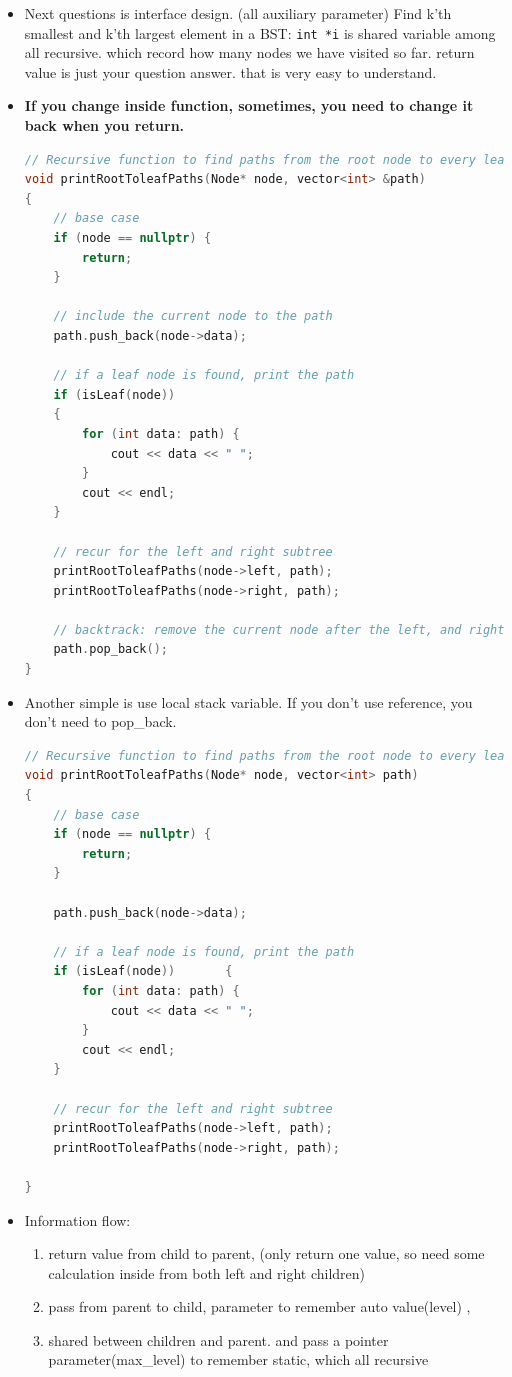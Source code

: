 \documentclass[a4paper,11pt,twoside]{book}
\begin{document}
\begin{itemize}
	\item Next questions is interface design. (all auxiliary parameter)
Find k’th smallest and k’th largest element in a BST:  \texttt{int *i} is shared variable among all recursive. which record how many nodes we have visited so far. return value is just your question answer. that is very easy to understand. 
	

\item \textbf{If you change inside function, sometimes, you need to change it back when you return.}
\begin{lstlisting}[frame=single, language=c++]
// Recursive function to find paths from the root node to every leaf node
void printRootToleafPaths(Node* node, vector<int> &path)
{
	// base case
	if (node == nullptr) {
		return;
	}
	
	// include the current node to the path
	path.push_back(node->data);
	
	// if a leaf node is found, print the path
	if (isLeaf(node))
	{
		for (int data: path) {
			cout << data << " ";
		}
		cout << endl;
	}
	
	// recur for the left and right subtree
	printRootToleafPaths(node->left, path);
	printRootToleafPaths(node->right, path);
	
	// backtrack: remove the current node after the left, and right subtree are done
	path.pop_back();
}	
\end{lstlisting}

\item Another simple is use local stack variable. If you don't use reference, you don't need to pop\_back.
\begin{lstlisting}[frame=single, language=c++]
// Recursive function to find paths from the root node to every leaf node
void printRootToleafPaths(Node* node, vector<int> path)
{
	// base case
	if (node == nullptr) {
		return;
	}
	
	path.push_back(node->data);
	
	// if a leaf node is found, print the path
	if (isLeaf(node))		{
		for (int data: path) {
			cout << data << " ";
		}
		cout << endl;
	}
	
	// recur for the left and right subtree
	printRootToleafPaths(node->left, path);
	printRootToleafPaths(node->right, path);
	
}		
\end{lstlisting}


\item Information flow:
\begin{enumerate}
	\item  return value from child to parent, (only return one value, so need some calculation inside from both left and right children)
	\item pass from parent to child, parameter to remember auto value(level) , 
	\item shared between children and parent. and pass a pointer parameter(max\_level) to remember static, which all recursive 
\end{enumerate}
	
\end{itemize}
\end{document}

